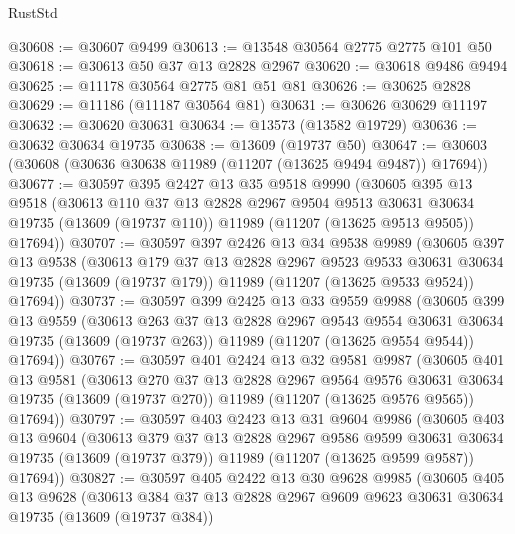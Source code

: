 \begin{lexlean}{RustStd}
\begin{coremodule}
@30608 := @30607 @9499
@30613 := @13548 @30564 @2775 @2775 @101 @50
@30618 := @30613 @50 @37 @13 @2828 @2967
@30620 := @30618 @9486 @9494
@30625 := @11178 @30564 @2775 @81 @51 @81
@30626 := @30625 @2828
@30629 := @11186 (@11187 @30564 @81)
@30631 := @30626 @30629 @11197
@30632 := @30620 @30631
@30634 := @13573 (@13582 @19729)
@30636 := @30632 @30634 @19735
@30638 := @13609 (@19737 @50)
@30647 := @30603 (@30608 (@30636 @30638 @11989 (@11207 (@13625 @9494 @9487)) @17694))
@30677 := @30597
    @395
    @2427
    @13
    @35
    @9518
    @9990
    (@30605
      @395
      @13
      @9518
      (@30613
        @110
        @37
        @13
        @2828
        @2967
        @9504
        @9513
        @30631
        @30634
        @19735
        (@13609 (@19737 @110))
        @11989
        (@11207 (@13625 @9513 @9505))
        @17694))
@30707 := @30597
    @397
    @2426
    @13
    @34
    @9538
    @9989
    (@30605
      @397
      @13
      @9538
      (@30613
        @179
        @37
        @13
        @2828
        @2967
        @9523
        @9533
        @30631
        @30634
        @19735
        (@13609 (@19737 @179))
        @11989
        (@11207 (@13625 @9533 @9524))
        @17694))
@30737 := @30597
    @399
    @2425
    @13
    @33
    @9559
    @9988
    (@30605
      @399
      @13
      @9559
      (@30613
        @263
        @37
        @13
        @2828
        @2967
        @9543
        @9554
        @30631
        @30634
        @19735
        (@13609 (@19737 @263))
        @11989
        (@11207 (@13625 @9554 @9544))
        @17694))
@30767 := @30597
    @401
    @2424
    @13
    @32
    @9581
    @9987
    (@30605
      @401
      @13
      @9581
      (@30613
        @270
        @37
        @13
        @2828
        @2967
        @9564
        @9576
        @30631
        @30634
        @19735
        (@13609 (@19737 @270))
        @11989
        (@11207 (@13625 @9576 @9565))
        @17694))
@30797 := @30597
    @403
    @2423
    @13
    @31
    @9604
    @9986
    (@30605
      @403
      @13
      @9604
      (@30613
        @379
        @37
        @13
        @2828
        @2967
        @9586
        @9599
        @30631
        @30634
        @19735
        (@13609 (@19737 @379))
        @11989
        (@11207 (@13625 @9599 @9587))
        @17694))
@30827 := @30597
    @405
    @2422
    @13
    @30
    @9628
    @9985
    (@30605
      @405
      @13
      @9628
      (@30613
        @384
        @37
        @13
        @2828
        @2967
        @9609
        @9623
        @30631
        @30634
        @19735
        (@13609 (@19737 @384))

\end{coremodule}
\end{lexlean}
